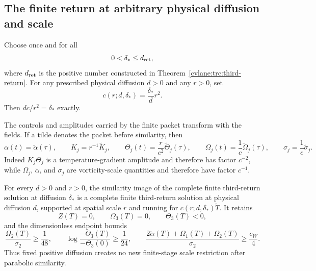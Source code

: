 \subsection{The finite return at arbitrary physical diffusion and scale}

Choose once and for all
\begin{equation}\label{cvlane:im:delta-star}
 0<\delta_*\leq d_{\rm ret},
\end{equation}
where $d_{\rm ret}$ is the positive number constructed in
Theorem~\ref{cvlane:trc:third-return}.  For any prescribed physical diffusion
$d>0$ and any $r>0$, set
\begin{equation}\label{cvlane:im:parabolic-clock}
 c(r;d,\delta_*)=\frac{\delta_*}{d}r^2.
\end{equation}
Then $dc/r^2=\delta_*$ exactly.

The controls and amplitudes carried by the finite packet transform with
the fields.  If a tilde denotes the packet before similarity, then
\begin{equation}\label{cvlane:im:control-map}
 \alpha(t)=\widetilde\alpha(\tau),\qquad
 K_j=r^{-1}\widetilde K_j,\qquad
 \Theta_j(t)=\frac r{c^2}\widetilde\Theta_j(\tau),\qquad
 \Omega_j(t)=\frac1c\widetilde\Omega_j(\tau),\qquad
 \sigma_j=\frac1c\widetilde\sigma_j .
\end{equation}
Indeed $K_j\Theta_j$ is a temperature-gradient amplitude and therefore
has factor $c^{-2}$, while $\Omega_j$, $\dot\alpha$, and $\sigma_j$ are
vorticity-scale quantities and therefore have factor $c^{-1}$.

\begin{cvlanetheorem}\label{cvlane:im:fixed-d-return}
For every $d>0$ and $r>0$, the similarity image of the complete finite
third-return solution at diffusion $\delta_*$ is a complete finite
third-return solution at physical diffusion $d$, supported at spatial
scale $r$ and running for
$c(r;d,\delta_*)\widetilde T$.  It retains
\[
 Z(T)=0,\qquad \Omega_3(T)=0,\qquad\Theta_3(T)<0,
\]
and the dimensionless endpoint bounds
\[
 \frac{\Omega_2(T)}{\sigma_2}\geq\frac1{48},\qquad
 \log\frac{-\Theta_3(T)}{-\Theta_3(0)}\geq\frac1{24},\qquad
 \frac{2\dot\alpha(T)+\Omega_1(T)+\Omega_2(T)}{\sigma_2}
 \geq\frac{c_W}{4}.
\]
Thus fixed positive diffusion creates no new finite-stage scale
restriction after parabolic similarity.
\end{cvlanetheorem}

